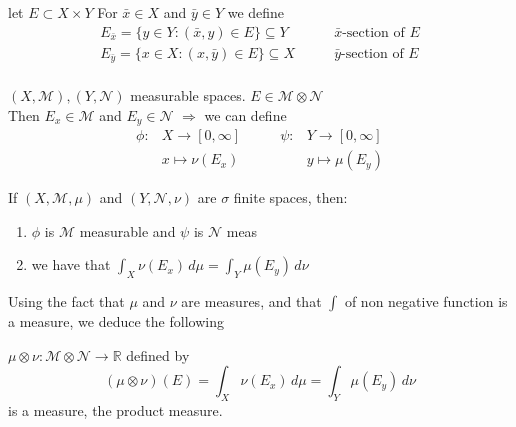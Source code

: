 \begin{definition}
    let \(E \subset X \times Y \) For \( \bar{x} \in X \) and \(\bar{y} \in Y \) we define
\[ 
    \begin{array}{ll}
        E_{\bar{x}} = \{ y \in Y: \left( \bar{x}, y \right) \in E \} \subseteq Y & \qquad \bar{x} \text{-section of } E \\
        E_{\bar{y}} = \{ x \in X: \left( x, \bar{y} \right) \in E \} \subseteq X & \qquad \bar{y} \mbox{-section of } E \\
    \end{array}
\]
\end{definition}

\begin{proposition}
    \(\left( X, \mathcal{M} \right), \left( Y, \mathcal{N} \right)\) measurable spaces. \(E \in \mathcal{M} \otimes \mathcal{N}\) \\
    Then \(E_x \in \mathcal{M} \) and \(E_y \in \mathcal{N} \) 
    \(\Rightarrow \) we can define 
    \[
    \begin{array}{rlrl}
        \phi : & X \rightarrow \left[ 0, \infty \right] & \qquad  \psi : &Y \rightarrow \left[ 0, \infty \right] \\
                & x \mapsto \nu(E_x) & & y \mapsto \mu(E_y) 
        
    \end{array}    
    \]
\end{proposition}


\begin{theorem}
    If \(\left(X, \mathcal{M}, \mu \right)\) and \(\left(Y, \mathcal{N}, \nu \right)\) are \(\sigma\) finite spaces, then:
    \begin{enumerate}
        \item \(\phi\) is \(\mathcal{M}\) measurable and \(\psi\) is \( \mathcal{N}\) meas
        \item we have that \(\int_X \nu(E_x) \, d\mu = \int_Y \mu(E_y) \, d\nu \)
    \end{enumerate}
\end{theorem}

Using the fact that \(\mu \) and \(\nu\) are measures, and that \(\int\) of non negative function is a measure, we deduce the following

\begin{theorem}
    \(\mu \otimes \nu : \mathcal{M} \otimes \mathcal{N} \rightarrow \mathbb{R} \) defined by
    \[ \left(\mu \otimes \nu \right)(E) = \int_X \nu(E_x) \, d\mu = \int_Y \mu(E_y) \, d\nu\]
    is a measure, the product measure.
\end{theorem}

